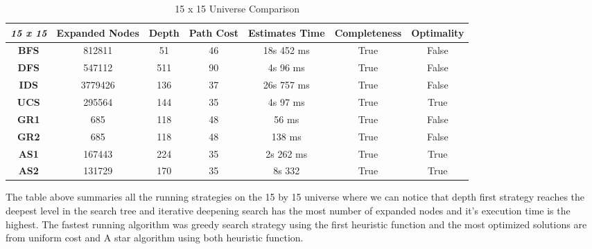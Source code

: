 \documentclass{article}
\begin{document}
\begin{table}[!hpt]
  \centering
  \begin{tabular}{|c|c|c|c|c|c|c|}
  \hline
  \cellcolor[HTML]{9B9B9B}\textit{\textbf{15 x 15}} & \textbf{Expanded Nodes} & \textbf{Depth} & \textbf{Path Cost} & \textbf{Estimates Time} & \textbf{Completeness} & \textbf{Optimality} \\ \hline
  \textbf{BFS}                                      & 812811                  & 51             & 46                 & 18s 452 ms  & True & False            \\ \hline
  \textbf{DFS}                                      & 547112                  & \cellcolor[HTML]{ffcccb}511            & 90                 & 4s 96 ms    & True & False            \\ \hline
  \textbf{IDS}                                      & \cellcolor[HTML]{ffcccb}3779426                 & 136            & 37                 & 26s 757 ms  & True & False            \\ \hline
  \textbf{UCS}                                      & 295564                  & 144            & 35                 & 4s 97 ms    & True & True            \\ \hline
  \textbf{GR1}                                      & 685                     & 118            & 48                 & 56 ms       & True & False            \\ \hline
  \textbf{GR2}                                      & 685                     & 118            & 48                 & 138 ms      & True & False            \\ \hline
  \textbf{AS1}                                      & 167443                  & 224            & 35                 & 2s 262 ms   & True & True            \\ \hline
  \textbf{AS2}                                      & 131729                  & 170            & 35                 & 8s 332      & True & True            \\ \hline
  \end{tabular}
  \caption{15 x 15 Universe Comparison}
  \label{tab:15by15}
  \end{table}

The table above summaries all the running strategies on the 15 by 15 universe where we can notice that depth first strategy reaches the deepest level in the search tree and iterative deepening search has the most number of expanded nodes and it's execution time is the highest. The fastest running algorithm was greedy search strategy using the first heuristic function and the most optimized solutions are from uniform cost and A star algorithm using both heuristic function.
\end{document}
